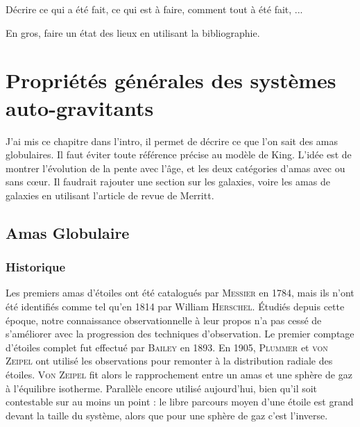 Décrire ce qui a été fait, ce qui est à faire, comment tout à été fait, ...

En gros, faire un état des lieux en utilisant la bibliographie.
\normalsize


\chapter{Propriétés générales des systèmes auto-gravitants}

	J'ai mis ce chapitre dans l'intro, il permet de décrire ce que l'on sait des
	amas globulaires. Il faut éviter toute référence précise au modèle de King.
	L'idée est de montrer l'évolution de la pente avec l'âge, et les deux
	catégories d'amas avec ou sans c\oe ur. Il faudrait rajouter une section sur
	les galaxies, voire les amas de galaxies en utilisant l'article de revue de
	Merritt.

	\minitoc
	\section{Amas Globulaire}
		\subsection{Historique}
			Les premiers amas d'étoiles ont été catalogués par \textsc{Messier} en 1784,
			mais ils n'ont été identifiés comme tel qu'en 1814 par William
			\textsc{Herschel}. Étudiés depuis cette époque, notre connaissance
			observationnelle à leur propos n'a pas cessé de s'améliorer avec la progression
			des techniques d'observation. Le premier comptage d'étoiles complet fut
			effectué par \textsc{Bailey} en 1893. En 1905, \textsc{Plummer} et \textsc{von
			Zeipel}	ont utilisé les observations pour remonter à la distribution radiale
			des étoiles. \textsc{Von Zeipel} fit alors le rapprochement entre un amas et
			une sphère de gaz à l'équilibre isotherme. Parallèle encore utilisé
			aujourd'hui, bien qu'il soit contestable sur au moins un point : le libre
			parcours moyen d'une étoile est grand devant la taille du système, alors que
			pour une sphère de gaz c'est l'inverse.

